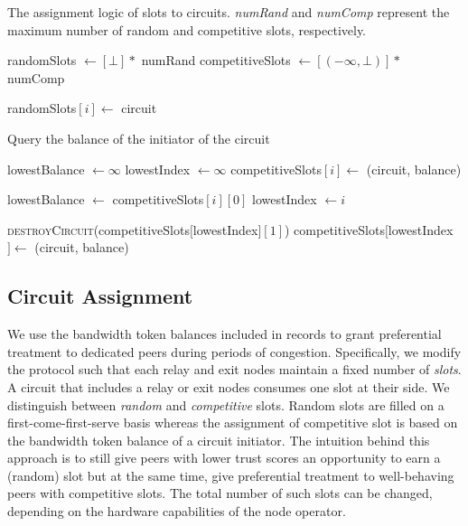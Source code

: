 \begin{algorithm}[!t]
	\caption{The assignment logic of slots to circuits. \emph{numRand} and \emph{numComp} represent the maximum number of random and competitive slots, respectively.}
	\label{alg:slot_logic}
	\begin{algorithmic}[1]
		\State randomSlots $ \leftarrow [\bot] * $ numRand
		\State competitiveSlots $ \leftarrow [(-\infty, \bot)] * $ numComp
		\State
		
		\State randomSlots$[i] \leftarrow $ circuit
		\State \Return
		\EndIf
		\EndFor
		
		\State Query the balance of the initiator of the circuit
		
		\EndFunction
		\State
		
		\State lowestBalance $ \leftarrow \infty $
		\State lowestIndex $ \leftarrow \infty $
		\State competitiveSlots$[i] \leftarrow $ (circuit, balance)
		\State \Return
		\EndIf
		
		\State lowestBalance $ \leftarrow $ competitiveSlots$[i][0] $
		\State lowestIndex $ \leftarrow i $
		\EndIf
		\EndFor
		
		\State \textsc{destroyCircuit}(competitiveSlots$[$lowestIndex$][1] $)
		\State competitiveSlots$[$lowestIndex$] \leftarrow $ (circuit, balance)
		\EndIf
		
		\EndFunction
		
	\end{algorithmic}
\end{algorithm}

\subsection{Circuit Assignment}
We use the bandwidth token balances included in \ModelName{} records to grant preferential treatment to dedicated peers during periods of congestion.
Specifically, we modify the \Tribler{} protocol such that each relay and exit nodes maintain a fixed number of \emph{slots}.
A circuit that includes a relay or exit nodes consumes one slot at their side.
We distinguish between \emph{random} and \emph{competitive} slots.
Random slots are filled on a first-come-first-serve basis whereas the assignment of competitive slot is based on the bandwidth token balance of a circuit initiator.
The intuition behind this approach is to still give peers with lower trust scores an opportunity to earn a (random) slot but at the same time, give preferential treatment to well-behaving peers with competitive slots.
The total number of such slots can be changed, depending on the hardware capabilities of the node operator.

